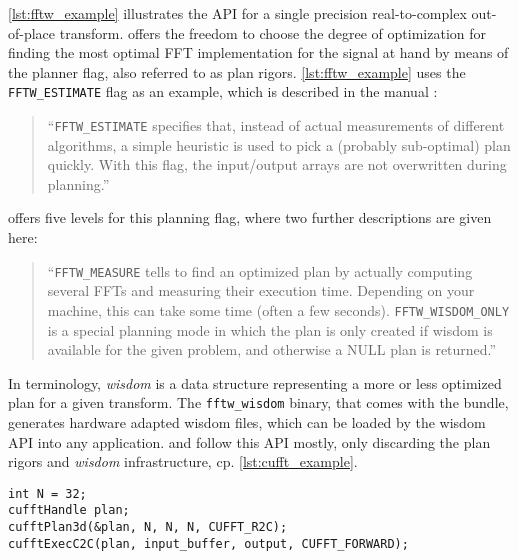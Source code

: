 \cref{lst:fftw_example} illustrates the \fftw{} API for a single precision real-to-complex out-of-place transform. \fftw{} offers the freedom to choose the degree of optimization for finding the most optimal FFT implementation for the signal at hand by means of the planner flag, also referred to as plan rigors. \cref{lst:fftw_example} uses the \texttt{FFTW\_ESTIMATE} flag as an example, which is described in the \fftw{} manual \cite{fftw_manual}:
%
\begin{quote}
``\texttt{FFTW\_ESTIMATE} specifies that, instead of actual measurements of different algorithms, a simple heuristic is used to pick a (probably sub-optimal) plan quickly. With this flag, the input/output arrays are not overwritten during planning.''
\end{quote}
%
\fftw{} offers five levels for this planning flag, where two further descriptions are given here:
\begin{quote}
``\texttt{FFTW\_MEASURE} tells \fftw{} to find an optimized plan by actually computing several FFTs and measuring their execution time. Depending on your machine, this can take some time (often a few seconds).\newline
\texttt{FFTW\_WISDOM\_ONLY} is a special planning mode in which the plan is only created if wisdom is available for the given problem, and otherwise a NULL plan is returned.''
\end{quote}
%
In \fftw{} terminology, \emph{wisdom} is a data structure representing a more or less optimized plan for a given transform. The \texttt{fftw\_wisdom} binary, that comes with the \fftw{} bundle, generates hardware adapted wisdom files, which can be loaded by the wisdom API into any \fftw{} application.
%
\cufft{} and \clfft{} follow this API mostly, only discarding the plan rigors and \emph{wisdom} infrastructure, cp. \cref{lst:cufft_example}.

\begin{lstlisting}[caption={Minimal usage example of the \cufft{} single precision real-to-complex planner API. Memory management is omitted.},label={lst:cufft_example}]
int N = 32;
cufftHandle plan;
cufftPlan3d(&plan, N, N, N, CUFFT_R2C);
cufftExecC2C(plan, input_buffer, output, CUFFT_FORWARD);
\end{lstlisting}

